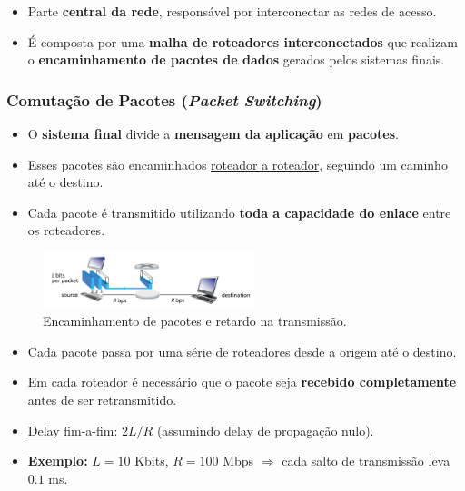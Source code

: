     \begin{itemize}
        \item Parte \textbf{central da rede}, responsável por interconectar as redes de acesso.
        \item É composta por uma \textbf{malha de roteadores interconectados} que realizam o \textbf{encaminhamento de pacotes de dados} gerados pelos sistemas finais.
    \end{itemize}

    \subsubsection*{Comutação de Pacotes (\textit{Packet Switching})}
    \begin{itemize}
        \item O \textbf{sistema final} divide a \textbf{mensagem da aplicação} em \textbf{pacotes}.
        \item Esses pacotes são encaminhados \underline{roteador a roteador}, seguindo um caminho até o destino.
        \item Cada pacote é transmitido utilizando \textbf{toda a capacidade do enlace} entre os roteadores.
    \end{itemize}

    \begin{figure}[H]
        \centering
        \includegraphics[width=0.55\textwidth]{img/cap-01/retardo.png}
        \caption{Encaminhamento de pacotes e retardo na transmissão.}
    \end{figure}

    \begin{itemize}
        \item Cada pacote passa por uma série de roteadores desde a origem até o destino.
        \item Em cada roteador é necessário que o pacote seja \textbf{recebido completamente} antes de ser retransmitido.
        \item \underline{Delay fim-a-fim}: $2L/R$ (assumindo delay de propagação nulo).
        \item \textbf{Exemplo:} $L = 10$ Kbits, $R = 100$ Mbps $\Rightarrow$ cada salto de transmissão leva $0.1$ ms.
    \end{itemize}

